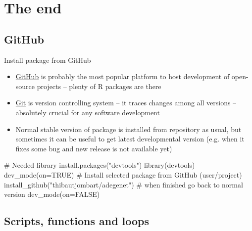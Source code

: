 \documentclass[compress, ucs, xelatex, 11pt, xcolor=svgnames,
  hyperref={
    bookmarks=true,
    unicode=true,
    colorlinks=true,
    pdftitle={Molecular data in R},
    plainpages=false,
    pdfauthor={Vojtech Zeisek},
    pdfsubject={Course about phylogeny and evolution in R},
    pdfcreator={XeLaTeX},
    pdfkeywords={R, evolution, phylogeny, molecular data},
    linkcolor=Tomato,
    anchorcolor=SaddleBrown,
    citecolor=Goldenrod,
    filecolor=DarkMagenta,
    menucolor=Sienna,
    urlcolor=DarkTurquoise,
    pdftex},
  url={hyphens, lowtilde} %
  ]{beamer}
\begin{document}
%

\section{The end}

\subsection{GitHub}

\begin{frame}[fragile]{Install package from GitHub}
  \begin{itemize}
    \item \href{https://github.com/}{GitHub} is probably the most popular platform to host development of open-source projects -- plenty of R packages are there
    \item \href{https://git-scm.com/}{Git} is version controlling system -- it traces changes among all versions -- absolutely crucial for any software development
    \item Normal stable version of package is installed from repository as usual, but sometimes it can be useful to get latest developmental version (e.g. when it fixes some bug and new release is not available yet)
  \end{itemize}
  \begin{spluscode}
    # Needed library
    install.packages("devtools")
    library(devtools)
    dev_mode(on=TRUE)
    # Install selected package from GitHub (user/project)
    install_github("thibautjombart/adegenet")
    # when finished go back to normal version
    dev_mode(on=FALSE)
  \end{spluscode}
\end{frame}

\subsection{Scripts, functions and loops}
\end{document}
